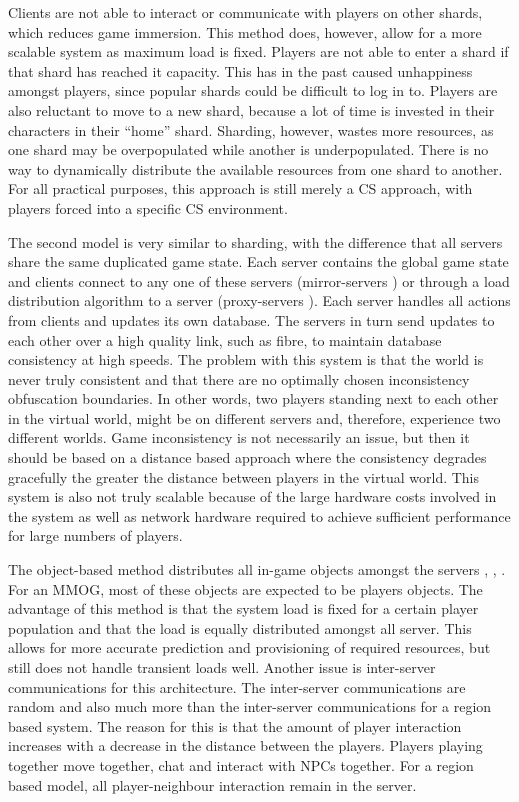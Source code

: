 \documentclass[journal,oneside,a4paper,onecolumn]{IEEEtran}
\begin{document}
Clients are not able to interact or communicate with players on other shards, which reduces game immersion. This method does, however, allow for a more scalable system as maximum load is fixed. Players are not able to enter a shard if that shard has reached it capacity. This has in the past caused unhappiness amongst players, since popular shards could be difficult to log in to. Players are also reluctant to move to a new shard, because a lot of time is invested in their characters in their ``home'' shard. Sharding, however, wastes more resources, as one shard may be overpopulated while another is underpopulated. There is no way to dynamically distribute the available resources from one shard to another. For all practical purposes, this approach is still merely a \ac{CS} approach, with players forced into a specific \ac{CS} environment.

The second model is very similar to sharding, with the difference that all servers share the same duplicated game state. Each server contains the global game state and clients connect to any one of these servers (mirror-servers \cite{mirrored_server}) or through a load distribution algorithm to a server (proxy-servers \cite{proxy_server_dist}). Each server handles all actions from clients and updates its own database. The servers in turn send updates to each other over a high quality link, such as fibre, to maintain database consistency at high speeds. The problem with this system is that the world is never truly consistent and that there are no optimally chosen inconsistency obfuscation boundaries. In other words, two players standing next to each other in the virtual world, might be on different servers and, therefore, experience two different worlds. Game inconsistency is not necessarily an issue, but then it should be based on a distance based approach where the consistency degrades gracefully the greater the distance between players in the virtual world. This system is also not truly scalable because of the large hardware costs involved in the system as well as network hardware required to achieve sufficient performance for large numbers of players.

The object-based method distributes all in-game objects amongst the servers \cite{object_based_consistency1}, \cite{object_based_consistency2}, \cite{object_based_consistency3}. For an MMOG, most of these objects are expected to be players objects. The advantage of this method is that the system load is fixed for a certain player population and that the load is equally distributed amongst all server. This allows for more accurate prediction and provisioning  of required resources, but still does not handle transient loads well. Another issue is inter-server communications for this architecture. The inter-server communications are random and also much more than the inter-server communications for a region based system. The reason for this is that the amount of player interaction increases with a decrease in the distance between the players. Players playing together move together, chat and interact with \acp{NPC} together. For a region based model, all player-neighbour interaction remain in the server.
\end{document}
